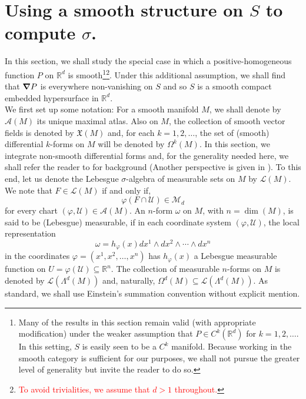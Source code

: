 \documentclass[11pt]{article}
\begin{document}
\section{Using a smooth structure on $S$ to compute $\sigma$.}\label{sec:SigmaForSmoothP}

\noindent In this section, we shall study the special case in which a positive-homogeneous function $P$ on $\mathbb{R}^d$ is smooth\footnote{Many of the results in this section remain valid (with appropriate modification) under the weaker assumption that $P\in C^k(\mathbb{R}^d)$ for $k=1,2,\dots$. In this setting, $S$ is easily seen to be a $C^k$ manifold. Because working in the smooth category is sufficient for our purposes, we shall not pursue the greater level of generality but invite the reader to do so.}\footnote{\textcolor{red}{To avoid trivialities, we assume that $d>1$ throughout.}}.
Under this additional assumption, we shall find that $\grad P$ is everywhere non-vanishing on $S$ and so $S$ is a smooth compact embedded hypersurface in $\mathbb{R}^d$.\\

\noindent We first set up some notation: For a smooth manifold $M$, we shall denote by $\mathcal{A}(M)$ its unique maximal atlas. Also on $M$, the collection of smooth vector fields is denoted by $\mathfrak{X}(M)$ and, for each $k=1,2,\dots$, the set of (smooth) differential $k$-forms on $M$ will be denoted by $\Omega^k(M)$.  In this section, we integrate non-smooth differential forms and, for the generality needed here, we shall refer the reader to \cite{Naber2011} for background (Another perspective is given in \cite{Amann2009}). To this end, let us denote the Lebesgue $\sigma$-algebra of measurable sets on $M$ by $\mathcal{L}(M)$. We note that $F\in\mathcal{L}(M)$ if and only if, \begin{equation*}
    \varphi(F\cap \mathcal{U})\in\mathcal{M}_d
\end{equation*}
for every chart $(\varphi,\mathcal{U})\in\mathcal{A}(M)$. An $n$-form $\omega$ on $M$, with $n=\dim(M)$, is said to be (Lebesgue) measurable, if in each coordinate system $(\varphi,\mathcal{U})$, the local representation
\begin{equation*}
    \omega=h_{\varphi}(x)dx^1\wedge dx^2\wedge \cdots\wedge dx^n
\end{equation*}
in the coordinates $\varphi=(x^1,x^2,\dots,x^n)$ has $h_{\varphi}(x)$ a Lebesgue measurable function on $U=\varphi(\mathcal{U})\subseteq\mathbb{R}^n$. The collection of measurable $n$-forms on $M$ is denoted by $\mathcal{L}(\Lambda^d(M))$ and, naturally, $\Omega^{d}(M)\subseteq \mathcal{L}(\Lambda^d(M))$. As standard, we shall use Einstein's summation convention without explicit mention.\\
\end{document}
